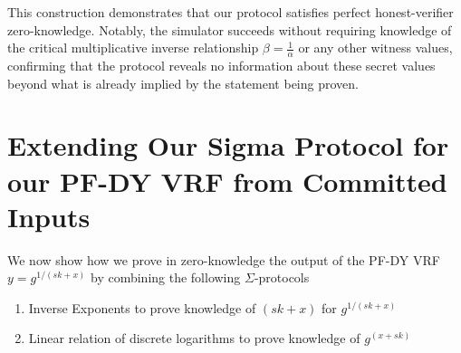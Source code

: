 This construction demonstrates that our protocol satisfies perfect honest-verifier zero-knowledge. Notably, the simulator succeeds without requiring knowledge of the critical multiplicative inverse relationship $\beta = \frac{1}{\alpha}$ or any other witness values, confirming that the protocol reveals no information about these secret values beyond what is already implied by the statement being proven.




\section{Extending Our Sigma Protocol for our PF-DY VRF from Committed Inputs}
We now show how we prove in zero-knowledge the output of the PF-DY VRF $y = g^{1/(sk + x)}$ by combining  the following $\Sigma$-protocols
\begin{enumerate}
    \item Inverse Exponents to prove knowledge of $(sk + x)$ for $g^{1/(sk + x)}$
    \item Linear relation of discrete logarithms to prove knowledge of $g^{(x+sk)}$
\end{enumerate}



